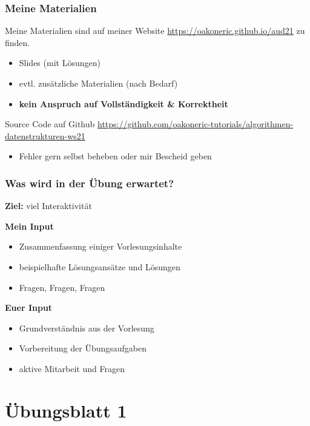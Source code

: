 \documentclass{beamer}
\begin{document}
	\begin{frame} \frametitle{Meine Materialien}
		Meine Materialien sind auf meiner Website \url{https://oakoneric.github.io/aud21} zu finden.
		\begin{itemize}
			\item Slides (mit Lösungen)
			\item evtl. zusätzliche Materialien (nach Bedarf)
			\item \alert{\textbf{kein Anspruch auf Vollständigkeit \& Korrektheit}}
		\end{itemize}
	
		Source Code auf Github
		\url{https://github.com/oakoneric-tutorials/algorithmen-datenstrukturen-ws21}
		
		\begin{itemize}
			\item Fehler gern selbst beheben oder mir Bescheid geben
		\end{itemize}
	\end{frame}

	\begin{frame} \frametitle{Was wird in der Übung erwartet?}
		\textbf{Ziel:} viel Interaktivität
		
		\textbf{Mein Input}
		\begin{itemize}
			\item Zusammenfassung einiger Vorlesungsinhalte
			\item beispielhafte Lösungsansätze und Lösungen
			\item Fragen, Fragen, Fragen
		\end{itemize}
		
		\pause
		
		\textbf{Euer Input}
		\begin{itemize}
			\item Grundverständnis aus der Vorlesung
			\item Vorbereitung der Übungsaufgaben
			\item aktive Mitarbeit und Fragen
		\end{itemize}
	\end{frame}


\section{Übungsblatt 1}
\end{document}
